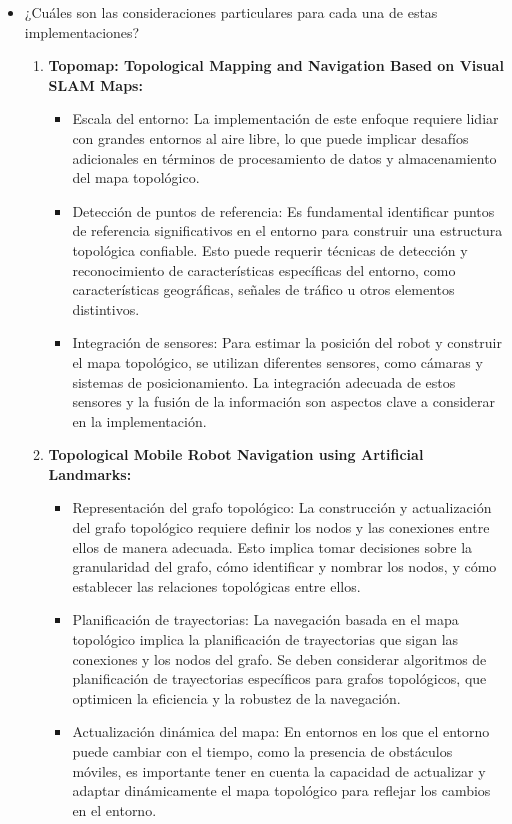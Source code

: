 \documentclass{article}
\begin{document}
\begin{itemize}
\item {¿Cuáles son las consideraciones particulares para cada una de estas implementaciones?} %

  \begin{enumerate}
  \item \textbf{Topomap: Topological Mapping and Navigation Based on Visual SLAM Maps:}
    \begin{itemize}
    \item Escala del entorno: La implementación de este enfoque requiere lidiar con grandes entornos al aire libre, lo que puede implicar desafíos adicionales en términos de procesamiento de datos y almacenamiento del mapa topológico.
    \item Detección de puntos de referencia: Es fundamental identificar puntos de referencia significativos en el entorno para construir una estructura topológica confiable. Esto puede requerir técnicas de detección y reconocimiento de características específicas del entorno, como características geográficas, señales de tráfico u otros elementos distintivos.
    \item Integración de sensores: Para estimar la posición del robot y construir el mapa topológico, se utilizan diferentes sensores, como cámaras y sistemas de posicionamiento. La integración adecuada de estos sensores y la fusión de la información son aspectos clave a considerar en la implementación.
    \end{itemize}
  \item \textbf{Topological Mobile Robot Navigation using Artificial Landmarks:}

    \begin{itemize}
    \item Representación del grafo topológico: La construcción y actualización del grafo topológico requiere definir los nodos y las conexiones entre ellos de manera adecuada. Esto implica tomar decisiones sobre la granularidad del grafo, cómo identificar y nombrar los nodos, y cómo establecer las relaciones topológicas entre ellos.
    \item Planificación de trayectorias: La navegación basada en el mapa topológico implica la planificación de trayectorias que sigan las conexiones y los nodos del grafo. Se deben considerar algoritmos de planificación de trayectorias específicos para grafos topológicos, que optimicen la eficiencia y la robustez de la navegación.
      \item Actualización dinámica del mapa: En entornos en los que el entorno puede cambiar con el tiempo, como la presencia de obstáculos móviles, es importante tener en cuenta la capacidad de actualizar y adaptar dinámicamente el mapa topológico para reflejar los cambios en el entorno.
    \end{itemize}


\end{enumerate}
\end{itemize}
\end{document}
